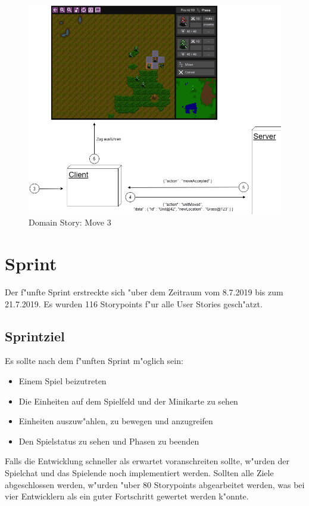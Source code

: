 \documentclass[12pt, titlepage]{scrartcl}
\newcommand{\RN}[1]{%
	\textup{\uppercase\expandafter{\romannumeral#1}}%
}
\begin{document}
		    	\begin{figure}[H] 
		    		\centering
		    		\includegraphics[width=\textwidth]{images/domain_stories/moveStory3.png}
		    		\caption{Domain Story: Move 3}
		    		\label{Domain_Story_Move_3}
		    	\end{figure}
	\newpage
	\section{Sprint \RN{5}}
	    Der f"unfte Sprint erstreckte sich "uber dem Zeitraum vom 8.7.2019 bis zum 21.7.2019. Es wurden 116 Storypoints f"ur alle User Stories gesch"atzt.
	    \subsection{Sprintziel} \label{Sprintgoal_5}
	        Es sollte nach dem f"unften Sprint m"oglich sein:
	        \begin{itemize}
	            \item Einem Spiel beizutreten
	            \item Die Einheiten auf dem Spielfeld und der Minikarte zu sehen
	            \item Einheiten auszuw"ahlen, zu bewegen und anzugreifen
	            \item Den Spielstatus zu sehen und Phasen zu beenden
	        \end{itemize}
	        Falls die Entwicklung schneller als erwartet voranschreiten sollte, w"urden der Spielchat und das Spielende noch implementiert werden. Sollten alle Ziele abgeschlossen werden, w"urden "uber 80 Storypoints abgearbeitet werden, was bei vier Entwicklern als ein guter Fortschritt gewertet werden k"onnte.
\end{document}
